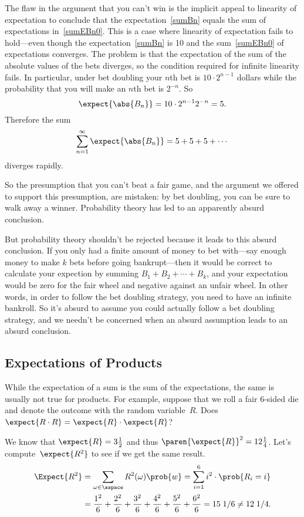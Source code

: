 The flaw in the argument that you can't win is the implicit appeal to
linearity of expectation to conclude that the
expectation~\eqref{sumBn} equals the sum of expectations
in~\eqref{sumEBn0}.  This is a case where linearity of expectation
fails to hold---even though the expectation~\eqref{sumBn} is 10 and
the sum~\eqref{sumEBn0} of expectations converges.  The problem is
that the expectation of the sum of the absolute values of the bets
diverges, so the condition required for infinite linearity fails.  In
particular, under bet doubling your $n$th bet is $10 \cdot 2^{n-1}$
dollars while the probability that you will make an $n$th bet is
$2^{-n}$.  So
\[
\expect{\abs{B_n}} = 10 \cdot 2^{n-1} 2^{-n} = 5.
\]
Therefore the sum
\[
\sum_{n = 1}^\infty \expect{\abs{B_n}} = 5 + 5 + 5 + \cdots
\]
diverges rapidly.

So the presumption that you can't beat a fair game, and the argument
we offered to support this presumption, are mistaken: by bet doubling,
you can be sure to walk away a winner.  Probability theory has led to
an apparently absurd conclusion.

But probability theory shouldn't be rejected because it leads to this
absurd conclusion.  If you only had a finite amount of money to bet
with---say enough money to make $k$ bets before going bankrupt---then
it would be correct to calculate your expection by summing
$B_1+B_2+\cdots+B_k$, and your expectation would be zero for the fair
wheel and negative against an unfair wheel.  In other words, in order
to follow the bet doubling strategy, you need to have an infinite
bankroll.  So it's absurd to assume you could actually follow a bet
doubling strategy, and we needn't be concerned when an absurd
assumption leads to an absurd conclusion.

\subsection{Expectations of Products}

While the expectation of a sum is the sum of the expectations, the same is
usually not true for products.  For example, suppose that we roll a
fair 6-sided die and denote the outcome with the random variable~$R$.
Does $\expect{R \cdot R} = \expect{R} \cdot \expect{R}$?

We know that $\expect{R} = 3\frac{1}{2}$ and thus $\paren{\expect{R}}^2 =
12\frac{1}{4}$.  Let's compute~$\expect{R^2}$ to see if we get the same
result.
\begin{align*}
\Expect{R^2}
   & = \sum_{\omega \in \sspace} R^2(\omega) \prob{w}
     = \sum_{i=1}^6 i^2 \cdot \prob{R_i = i} \\
   & = \frac{1^2}{6} + \frac{2^2}{6} + \frac{3^2}{6} +
            \frac{4^2}{6} + \frac{5^2}{6} + \frac{6^2}{6} 
     =  15\; 1/6 \neq  12 \; 1/4.
\end{align*}


